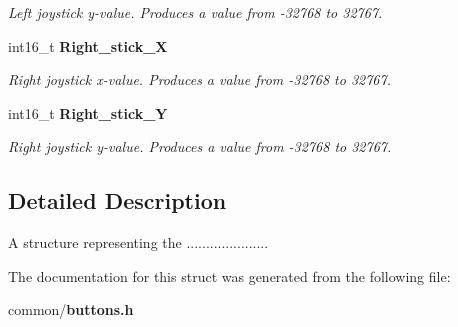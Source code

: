 \begin{DoxyCompactItemize}
\begin{DoxyCompactList}\small\item\em Left joystick y-\/value. Produces a value from -\/32768 to 32767. \end{DoxyCompactList}\item 
int16\-\_\-t {\bf Right\-\_\-stick\-\_\-\-X}\label{structbutton_a7fa6690fc1458901c72ef7997270fea7}

\begin{DoxyCompactList}\small\item\em Right joystick x-\/value. Produces a value from -\/32768 to 32767. \end{DoxyCompactList}\item 
int16\-\_\-t {\bf Right\-\_\-stick\-\_\-\-Y}\label{structbutton_acabf34ad61f696e479607ca456f25fc4}

\begin{DoxyCompactList}\small\item\em Right joystick y-\/value. Produces a value from -\/32768 to 32767. \end{DoxyCompactList}\end{DoxyCompactItemize}


\subsection{Detailed Description}
A structure representing the ..................... 

The documentation for this struct was generated from the following file\-:\begin{DoxyCompactItemize}
\item 
common/{\bf buttons.\-h}\end{DoxyCompactItemize}
